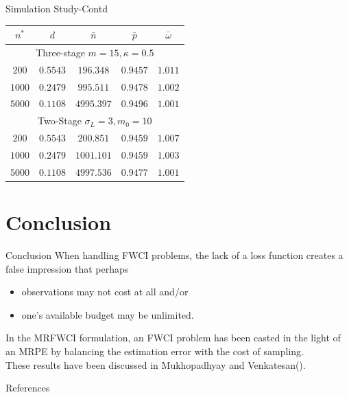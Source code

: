 \documentclass [xcolor=svgnames, t] {beamer}
\begin{document}
\begin{frame}{Simulation Study-Contd}
\vspace{7mm}

 \begin{center}
\begin{tabular}{c c c c c} 
 \hline
 $n^*$ & $d$ & $\bar{n}$ & $\bar{p}$ & $\bar{\omega}$\\
 \hline
 \multicolumn{5}{c}{Three-stage $m=15,\kappa=0.5$}\\
  \hline
 $200$ & $0.5543$ & $196.348$ & $0.9457$  & $1.011$\\ 
 $1000$ & $0.2479$ & $995.511$ & $0.9478$ & $1.002$ \\ 
  $5000$ & $0.1108$ & $4995.397$ & $0.9496$ & $1.001$ \\ 
  \hline
\multicolumn{5}{c}{Two-Stage $\sigma_L=3, m_0=10$}\\
 \hline
 $200$ & $0.5543$ & $200.851$ & $0.9459$ & $1.007$ \\ 
 $1000$ & $0.2479$ & $1001.101$ & $0.9459$  & $1.003$\\ 
  $5000$ & $0.1108$ & $4997.536$ & $0.9477$  & $1.001$\\ 
 \hline
\end{tabular}
\end{center}
    
\end{frame}


    

\section{Conclusion}
\begin{frame}{Conclusion}
\vspace{5mm}
When handling FWCI problems, the lack of a loss function creates a false impression that perhaps 
\begin{itemize}
\item observations may not cost at all and/or 
\item one's available budget may be unlimited. 
\end{itemize}
In the MRFWCI formulation, an FWCI problem has been casted in the light of an MRPE by 
balancing the estimation error with the cost of sampling.\\
\vspace{0.2cm}
These results have been discussed in Mukhopadhyay and Venkatesan(\cite{mrfwci2022}).
\end{frame}

\begin{frame}[allowframebreaks]{References}





\end{frame}
\end{document}
